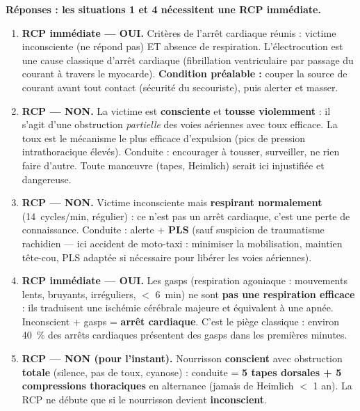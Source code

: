 \documentclass[11pt]{article}
\newcommand{\cle}[1]{{\popxbold\color{popdark}#1}}
\begin{document}
\begin{corrige}
\textbf{Réponses : les situations 1 et 4 nécessitent une RCP immédiate.}

\begin{enumerate}
    \item \textbf{RCP immédiate — OUI.} Critères de l'arrêt cardiaque réunis : victime \cle{inconsciente} (ne répond pas) ET \cle{absence de respiration}. L'électrocution est une cause classique d'arrêt cardiaque (fibrillation ventriculaire par passage du courant à travers le myocarde). \textbf{Condition préalable :} couper la source de courant avant tout contact (sécurité du secouriste), puis alerter et masser.
    \item \textbf{RCP — NON.} La victime est \textbf{consciente} et \textbf{tousse violemment} : il s'agit d'une obstruction \emph{partielle} des voies aériennes avec toux efficace. La toux est le mécanisme le plus efficace d'expulsion (pics de pression intrathoracique élevés). Conduite : encourager à tousser, surveiller, ne rien faire d'autre. Toute manœuvre (tapes, Heimlich) serait ici injustifiée et dangereuse.
    \item \textbf{RCP — NON.} Victime inconsciente mais \textbf{respirant normalement} (\SI{14}{cycles/min}, régulier) : ce n'est pas un arrêt cardiaque, c'est une \cle{perte de connaissance}. Conduite : alerte + \textbf{PLS} (sauf suspicion de traumatisme rachidien — ici accident de moto-taxi : minimiser la mobilisation, maintien tête-cou, PLS adaptée si nécessaire pour libérer les voies aériennes).
    \item \textbf{RCP immédiate — OUI.} Les \cle{gasps} (respiration agoniaque : mouvements lents, bruyants, irréguliers, $<$ \SI{6}{min}) ne sont \textbf{pas une respiration efficace} : ils traduisent une ischémie cérébrale majeure et équivalent à une apnée. Inconscient + gasps = \textbf{arrêt cardiaque}. C'est le piège classique : environ \SI{40}{\%} des arrêts cardiaques présentent des gasps dans les premières minutes.
    \item \textbf{RCP — NON (pour l'instant).} Nourrisson \textbf{conscient} avec obstruction \textbf{totale} (silence, pas de toux, cyanose) : conduite = \textbf{5 tapes dorsales + 5 compressions thoraciques} en alternance (jamais de Heimlich $<$ 1 an). La RCP ne débute que si le nourrisson devient \textbf{inconscient}.
\end{enumerate}
\end{corrige}
\end{document}
